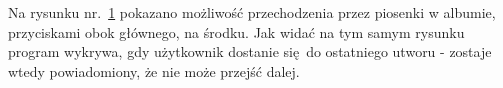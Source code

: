 \begin{figure}[H]
	\caption{}
	\label{fig:test_player_nextcap}
\end{figure}

Na rysunku nr.~\ref{fig:test_player_nextcap} pokazano możliwość przechodzenia przez piosenki w albumie, przyciskami obok głównego, na środku. Jak widać na tym samym rysunku program wykrywa, gdy użytkownik dostanie się do ostatniego utworu - zostaje wtedy powiadomiony, że nie może przejść dalej.
